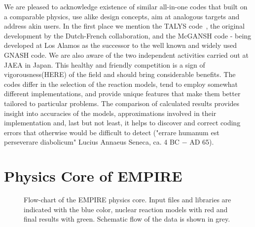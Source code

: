 \documentclass[twocolumn,amsmath,amssymb,10pt,groupedaddress,a4paper]{revtex4}
\begin{document}
We are pleased to acknowledge existence of similar all-in-one codes that built on a comparable physics, use alike design concepts, aim at analogous targets and address akin users. In the first place we mention the TALYS code~\cite{TALYS}, the original development by the Dutch-French collaboration, and the McGANSH code - being developed at Los Alamos as the successor to the well known and widely used GNASH code. We are also aware of the two independent activities carried out at JAEA in Japan. This healthy and friendly competition is a sign of vigorousness(HERE) of the field and should bring considerable benefits. The codes differ in the selection of the reaction models, tend to employ somewhat different implementations, and provide unique  features that make them better tailored to particular problems. The comparison of calculated results provides insight into accuracies of the models, approximations involved in their implementation and, last but not least, it helps to discover and correct coding errors that otherwise would be difficult to detect ("errare humanum est perseverare diabolicum" Lucius Annaeus Seneca, ca. 4 BC $-$ AD 65).


\section{Physics Core of EMPIRE}

\begin{figure*}[htbp]
\caption{Flow-chart of the EMPIRE physics core. Input files and libraries are indicated with the blue color, nuclear reaction models with red and final results with green. Schematic flow of the data is shown in grey.}
\label{fig:physics-core}
\end{figure*}
\end{document}
